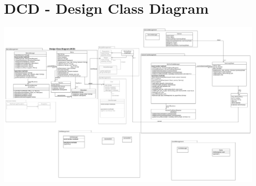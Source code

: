 \chapter{DCD - Design Class Diagram}

\begin{center}
    \includegraphics[scale = 0.15]{images/DCD/DCD.png}
  \end{center}